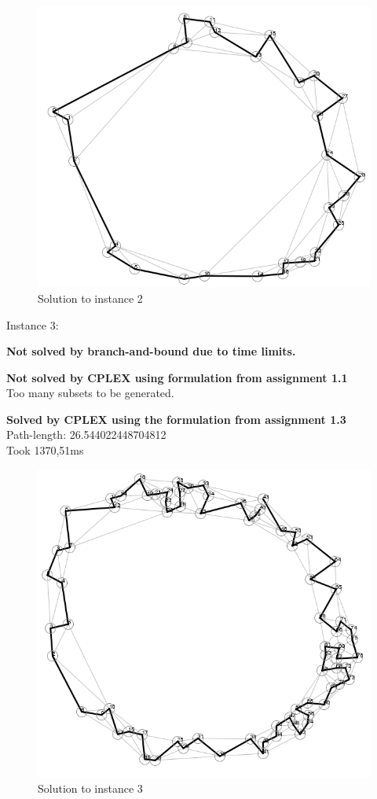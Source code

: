 \begin{figure}[H]
	\includegraphics[width=.9\textwidth]{figures/Instance2Solution.png}
	\caption{Solution to instance 2}
	\label{solution:2}
\end{figure}

\newpar Instance 3:

\newpar \textbf{Not solved by branch-and-bound due to time limits.}

\newpar \textbf{Not solved by CPLEX using formulation from assignment 1.1}\\
Too many subsets to be generated.

\newpar \textbf{Solved by CPLEX using the formulation from assignment 1.3}\\
Path-length: 26.544022448704812\\
Took 1370,51ms

\begin{figure}[H]
	\includegraphics[width=.9\textwidth]{figures/Instance3Solution.png}
	\caption{Solution to instance 3}
	\label{solution:3}
\end{figure}


\subsection{}